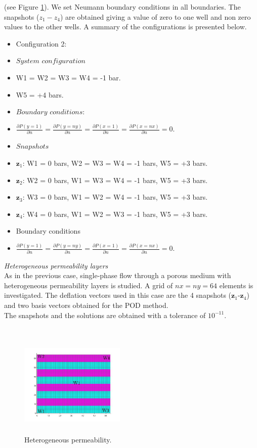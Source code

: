 \documentclass{ecmorXV}
\begin{document}
(see Figure \ref{fig:hep1}). We set Neumann boundary conditions in all boundaries. 
The snapshots ($z_1-z_4$) are obtained giving a value of zero to one well and non 
zero values to the other wells. 
A summary of the configurations is presented below.
\begin{itemize}
\item[] Configuration 2:
\item[]  $System$ $configuration$ 
 \item[]  W1 =  W2 = W3 = W4 = -1 bar.
 \item[] W5 = +4 bars.
\item[] $Boundary$ $conditions:$
\item[] $\frac{\partial P(y=1)}{\partial n}=\frac{\partial P(y=ny)}{\partial n}=\frac{\partial P(x=1)}{\partial n}=\frac{\partial P(x=nx)}{\partial n}=0$.
\item[] $Snapshots$
 \item[] $\mathbf{z}_1$: W1 = 0 bars, W2 = W3 = W4 =  -1 bars, W5 = +3 bars.
\item[] $\mathbf{z}_2$: W2 = 0 bars, W1 = W3 = W4 = -1 bars, W5 =  +3 bars.
\item[] $\mathbf{z}_3$: W3 = 0 bars, W1 = W2 = W4 = -1 bars, W5 =  +3 bars.
\item[] $\mathbf{z}_4$: W4 = 0 bars, W1 = W2 = W3 = -1 bars, W5 =  +3 bars.
 \item[] Boundary conditions 
\item[] $\frac{\partial P(y=1)}{\partial n}=\frac{\partial P(y=ny)}{\partial n}=\frac{\partial P(x=1)}{\partial n}=\frac{\partial P(x=nx)}{\partial n}=0$.
\end{itemize}
\normalsize

\emph{Heterogeneous permeability layers}\\
As in the previous case, single-phase flow through a porous medium with heterogeneous permeability layers is studied.
A grid of $nx = ny = 64$ elements is investigated. The deflation vectors used in this case are the 4 snapshots ($\mathbf{z}_1$-$\mathbf{z}_4$) and
two basis vectors obtained for the POD method.\\
The snapshots and the solutions are obtained with a tolerance of $10^{-11}$. \\\\
\begin{figure}[!h]
\centering
\includegraphics[width=5cm,height=5cm,keepaspectratio]
{perm_he_2.jpg}
\caption{ Heterogeneous permeability.}\label{fig:hep1}
\end{figure}
\end{document}
